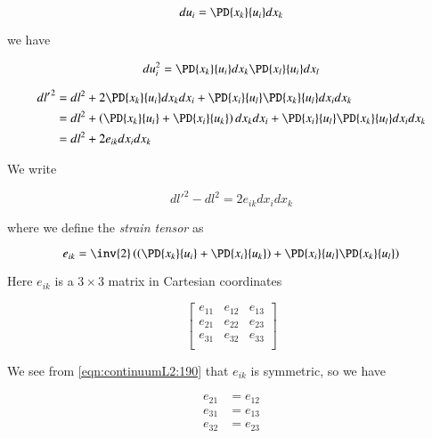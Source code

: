 \begin{equation}\label{eqn:continuumL2:130}
du_i = \PD{x_k}{u_i} dx_k
\end{equation}

we have

\begin{equation}\label{eqn:continuumL2:150}
du_i^2 = 
\PD{x_k}{u_i} dx_k
\PD{x_l}{u_i} dx_l
\end{equation}

\begin{align*}
{dl'}^2 
&= 
dl^2 
+ 2 \PD{x_k}{u_i} dx_k dx_i 
+ \PD{x_i}{u_l} 
\PD{x_k}{u_l} 
dx_i dx_k \\
&= 
dl^2 
+ 
\left(
\PD{x_k}{u_i} 
+
\PD{x_i}{u_k} 
\right)
dx_k dx_i 
+ \PD{x_i}{u_l} 
\PD{x_k}{u_l} 
dx_i dx_k \\
&=
dl^2 
+ 
2 e_{ik} dx_i dx_k
\end{align*}

We write

\begin{equation}\label{eqn:continuumL2:170}
{dl'}^2 - dl^2 = 2 e_{ik} dx_i dx_k
\end{equation}

where we define the \emph{strain tensor} as

\begin{equation}\label{eqn:continuumL2:190}
e_{ik} = \inv{2} \left(
\left(
\PD{x_k}{u_i} 
+
\PD{x_i}{u_k} 
\right)
+ \PD{x_i}{u_l} 
\PD{x_k}{u_l} 
\right)
\end{equation}

Here $e_{ik}$ is a $3 \times 3$ matrix in Cartesian coordinates

\begin{equation}\label{eqn:continuumL2:210}
\begin{bmatrix}
e_{11} & e_{12} & e_{13} \\
e_{21} & e_{22} & e_{23} \\
e_{31} & e_{32} & e_{33} \\
\end{bmatrix}
\end{equation}

We see from \ref{eqn:continuumL2:190} that $e_{ik}$ is symmetric, so we have

\begin{align}\label{eqn:continuumL2:n}
e_{21} &= e_{12} \\
e_{31} &= e_{13} \\
e_{32} &= e_{23}
\end{align}

